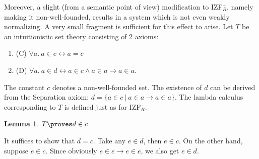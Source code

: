\documentclass{LMCS}
\newtheorem{lemma}[thm]{Lemma}
\newcommand\iffl{\ensuremath{\leftrightarrow}}
\newcommand{\p}{\proves}
\newcommand{\iizfr}{IZF${}_R^{-}$}
\begin{document}
Moreover, a slight (from a semantic point of view) modification to \iizfr,
namely making it non-well-founded, results in a system which is not even
weakly normalizing. A very small fragment is sufficient for this effect to
arise. Let $T$ be an intuitionistic set theory consisting of 2 axioms:

\begin{enumerate}[$\bullet$]
\item (C) $\forall a.\ a \in c \iffl a = c$
\item (D) $\forall a.\ a \in d \iffl a \in c \land a \in a \to a \in a$.
\end{enumerate}

The constant $c$ denotes a non-well-founded set. The existence of $d$ can
be derived from the Separation axiom: $d = \{ a \in c\ | \ a \in a \to a \in a
\}$. The lambda calculus corresponding to $T$ is defined just as for \iizfr.

\begin{lemma}\label{dc}
$T \p d \in c$
\end{lemma}
\proof It suffices to show that $d = c$. Take any $e \in d$, then $e \in c$. On the
other hand, suppose $e \in c$. Since obviously $e \in e \to e \in e$, we
also get $e \in d$.\proof
\end{document}

